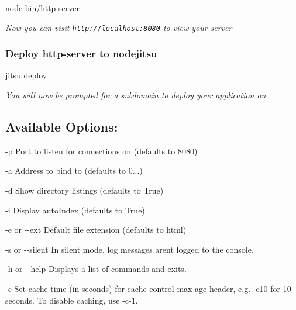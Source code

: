 \begin{DoxyVerb} node bin/http-server
\end{DoxyVerb}


{\itshape Now you can visit \href{http://localhost:8080}{\tt http\+://localhost\+:8080} to view your server}

\subsubsection*{Deploy http-\/server to nodejitsu}

\begin{DoxyVerb} jitsu deploy
\end{DoxyVerb}


{\itshape You will now be prompted for a {\ttfamily subdomain} to deploy your application on}

\subsection*{Available Options\+:}

{\ttfamily -\/p} Port to listen for connections on (defaults to 8080)

{\ttfamily -\/a} Address to bind to (defaults to \textquotesingle{}0...\textquotesingle{})

{\ttfamily -\/d} Show directory listings (defaults to \textquotesingle{}True\textquotesingle{})

{\ttfamily -\/i} Display auto\+Index (defaults to \textquotesingle{}True\textquotesingle{})

{\ttfamily -\/e} or {\ttfamily -\/-\/ext} Default file extension (defaults to \textquotesingle{}html\textquotesingle{})

{\ttfamily -\/s} or {\ttfamily -\/-\/silent} In silent mode, log messages aren\textquotesingle{}t logged to the console.

{\ttfamily -\/h} or {\ttfamily -\/-\/help} Displays a list of commands and exits.

{\ttfamily -\/c} Set cache time (in seconds) for cache-\/control max-\/age header, e.\+g. -\/c10 for 10 seconds. To disable caching, use -\/c-\/1. 